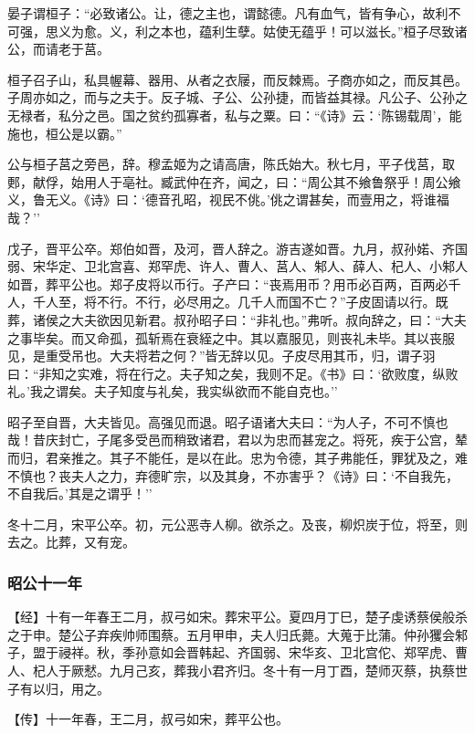 \documentclass[]{article}
\begin{document}
晏子谓桓子：``必致诸公。让，德之主也，谓懿德。凡有血气，皆有争心，故利不可强，思义为愈。义，利之本也，蕴利生孽。姑使无蕴乎！可以滋长。''桓子尽致诸公，而请老于莒。

桓子召子山，私具幄幕、器用、从者之衣屦，而反棘焉。子商亦如之，而反其邑。子周亦如之，而与之夫于。反子城、子公、公孙捷，而皆益其禄。凡公子、公孙之无禄者，私分之邑。国之贫约孤寡者，私与之粟。曰：``《诗》云：`陈锡载周'，能施也，桓公是以霸。''

公与桓子莒之旁邑，辞。穆孟姬为之请高唐，陈氏始大。秋七月，平子伐莒，取郠，献俘，始用人于亳社。臧武仲在齐，闻之，曰：``周公其不飨鲁祭乎！周公飨义，鲁无义。《诗》曰：`德音孔昭，视民不佻。'佻之谓甚矣，而壹用之，将谁福哉？''

戊子，晋平公卒。郑伯如晋，及河，晋人辞之。游吉遂如晋。九月，叔孙婼、齐国弱、宋华定、卫北宫喜、郑罕虎、许人、曹人、莒人、邾人、薛人、杞人、小邾人如晋，葬平公也。郑子皮将以币行。子产曰：``丧焉用币？用币必百两，百两必千人，千人至，将不行。不行，必尽用之。几千人而国不亡？''子皮固请以行。既葬，诸侯之大夫欲因见新君。叔孙昭子曰：``非礼也。''弗听。叔向辞之，曰：``大夫之事毕矣。而又命孤，孤斩焉在衰絰之中。其以嘉服见，则丧礼未毕。其以丧服见，是重受吊也。大夫将若之何？''皆无辞以见。子皮尽用其币，归，谓子羽曰：``非知之实难，将在行之。夫子知之矣，我则不足。《书》曰：`欲败度，纵败礼。'我之谓矣。夫子知度与礼矣，我实纵欲而不能自克也。''

昭子至自晋，大夫皆见。高强见而退。昭子语诸大夫曰：``为人子，不可不慎也哉！昔庆封亡，子尾多受邑而稍致诸君，君以为忠而甚宠之。将死，疾于公宫，辇而归，君亲推之。其子不能任，是以在此。忠为令德，其子弗能任，罪犹及之，难不慎也？丧夫人之力，弃德旷宗，以及其身，不亦害乎？《诗》曰：`不自我先，不自我后。'其是之谓乎！''

冬十二月，宋平公卒。初，元公恶寺人柳。欲杀之。及丧，柳炽炭于位，将至，则去之。比葬，又有宠。

\hypertarget{header-n2541}{%
\subsubsection{昭公十一年}\label{header-n2541}}

【经】十有一年春王二月，叔弓如宋。葬宋平公。夏四月丁巳，楚子虔诱蔡侯般杀之于申。楚公子弃疾帅师围蔡。五月甲申，夫人归氏薨。大蒐于比蒲。仲孙玃会邾子，盟于祲祥。秋，季孙意如会晋韩起、齐国弱、宋华亥、卫北宫佗、郑罕虎、曹人、杞人于厥憖。九月己亥，葬我小君齐归。冬十有一月丁酉，楚师灭蔡，执蔡世子有以归，用之。

【传】十一年春，王二月，叔弓如宋，葬平公也。
\end{document}

